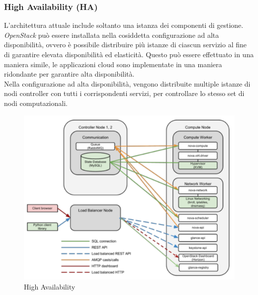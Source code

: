 \documentclass{article}
\begin{document}
\subsubsection{High Availability (HA)}
L'architettura attuale include soltanto una istanza dei componenti di gestione. \textit{OpenStack} può essere installata nella cosiddetta configurazione ad alta disponibilità, ovvero è possibile distribuire più istanze di ciascun servizio al fine di garantire elevata disponibilità ed elasticità. Questo può essere effettuato in una maniera simile, le applicazioni cloud sono implementate in una maniera ridondante per garantire alta disponibilità. \\
Nella configurazione ad alta disponibilità, vengono distribuite multiple istanze di nodi controller con tutti i corrispondenti servizi, per controllare lo stesso set di nodi computazionali.
\begin{figure}[H]
    \centering
    \includegraphics[scale=0.3]{img/high availability 1.png}
    \caption{High Availability}
\end{figure}\noindent
\end{document}
